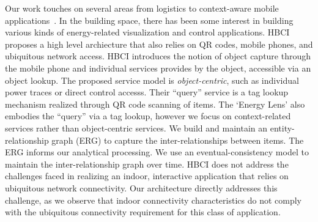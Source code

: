 Our work touches on several areas from logistics%
to context-aware 
mobile applications~\cite{ACE}.  
In the building space, there has been
some interest in building various kinds of energy-related visualization and control applications.
HBCI~\cite{hbci} proposes a high level archiecture that also relies on QR codes, mobile phones, and ubiquitous network access.  HBCI introduces 
the notion of object capture through 
the mobile phone and  individual services provides by the object, accessible via an object lookup.  The proposed service model is 
\emph{object-centric}, such as individual power traces or direct control accesss.  Their ``query'' service is a tag lookup mechanism realized through
 QR code scanning of items.  The `Energy Lens' also embodies the ``query'' via a tag lookup, however 
we focus on context-related services rather than object-centric services.  We build and maintain an entity-relationship graph (ERG) to
capture the inter-relationships between items.  The ERG informs our analytical processing.  We use an eventual-consistency model to 
maintain the inter-relationship graph over time.  HBCI does not address the challenges faced in realizing an indoor, interactive application 
that relies on ubiquitous network connectivity.  Our architecture directly addresses this challenge, as we observe that indoor connectivity characteristics do 
not comply with the ubiquitous connectivity requirement for this class of application.



